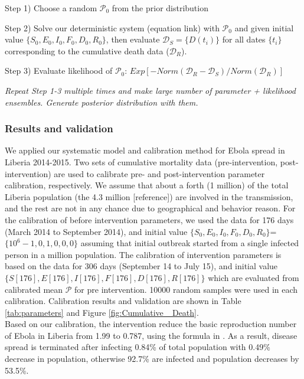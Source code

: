 Step 1) Choose a random $\mathcal{P}_0$ from the prior distribution

Step 2) Solve our deterministic system (equation link) with $\mathcal{P}_0$ and given initial value $\{S_0,E_0,I_0,F_0,D_0,R_0\}$, then evaluate $\mathcal{D}_S=\{D(t_i)\}$ for all dates $\{t_i\}$ corresponding to the cumulative death data ($\mathcal{D}_R$).

Step 3) Evaluate likelihood of $\mathcal{P}_0$: $Exp[-Norm(\mathcal{D}_R-\mathcal{D}_S)/Norm(\mathcal{D}_R)]$

\emph{Repeat Step 1-3 multiple times and make large number of {parameter + likelihood} ensembles. Generate posterior distribution with them.}

\subsubsection{Results and validation}
We applied our systematic model and calibration method for Ebola spread in Liberia 2014-2015. Two sets of cumulative mortality data (pre-intervention, post-intervention) are used to calibrate pre- and post-intervention parameter calibration, respectively. We assume that about a forth (1 million) of the total Liberia population (the 4.3 million [reference]) are involved in the transmission, and the rest are not in any chance due to geographical and behavior reason. For the calibration of before intervention parameters, we used the data for 176 days (March 2014 to September 2014), and initial value $\{S_0,E_0,I_0,F_0,D_0,R_0\}$=$\{10^6-1,0,1,0,0,0\}$ assuming that initial outbreak started from a single infected person in a million population. The calibration of intervention parameters is based on the data for 306 days (September 14 to July 15), and initial value $\{S[176],E[176],I[176],F[176],D[176],R[176]\}$ which are evaluated from calibrated mean $\mathcal{P}$ for pre intervention. 10000 random samples were used in each calibration. Calibration results and validation are shown in Table \ref{tab:parameters} and Figure \ref{fig:Cumulative _Death}.\\

Based on our calibration, the intervention reduce the basic reproduction number of Ebola in Liberia from 1.99 to 0.787, using the formula in \cite{Legrand2007}. As a result, disease spread is terminated after infecting 0.84\% of total population with 0.49\% decrease in population, otherwise 92.7\% are infected and population decreases by 53.5\%.\\

